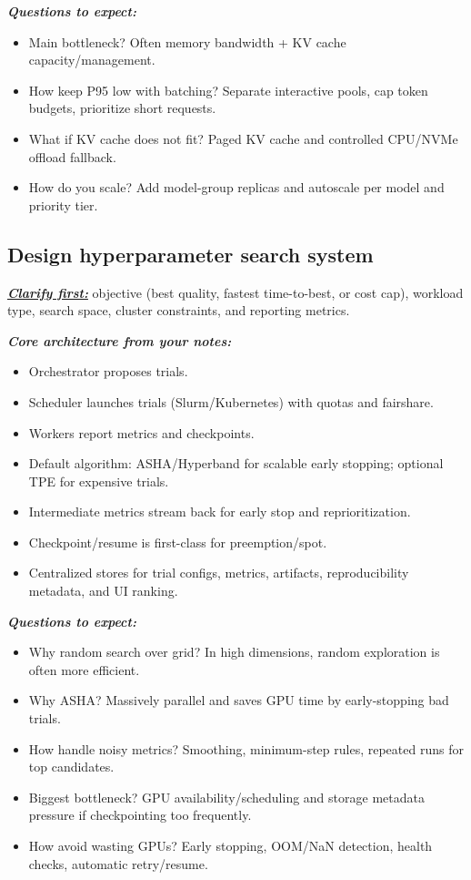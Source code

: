 \documentclass[12pt]{article}
\newcommand{\keysent}[1]{\textbf{\textit{\uline{#1}}}}
\let\origtextbf\textbf
\renewcommand{\textbf}[1]{\origtextbf{\textit{#1}}}
\begin{document}
\textbf{Questions to expect:}
\begin{itemize}
\item Main bottleneck? Often memory bandwidth + KV cache capacity/management.
\item How keep P95 low with batching? Separate interactive pools, cap token budgets, prioritize short requests.
\item What if KV cache does not fit? Paged KV cache and controlled CPU/NVMe offload fallback.
\item How do you scale? Add model-group replicas and autoscale per model and priority tier.
\end{itemize}

\subsection{Design hyperparameter search system}
\keysent{Clarify first:} objective (best quality, fastest time-to-best, or cost cap), workload type, search space, cluster constraints, and reporting metrics.

\textbf{Core architecture from your notes:}
\begin{itemize}
\item Orchestrator proposes trials.
\item Scheduler launches trials (Slurm/Kubernetes) with quotas and fairshare.
\item Workers report metrics and checkpoints.
\item Default algorithm: ASHA/Hyperband for scalable early stopping; optional TPE for expensive trials.
\item Intermediate metrics stream back for early stop and reprioritization.
\item Checkpoint/resume is first-class for preemption/spot.
\item Centralized stores for trial configs, metrics, artifacts, reproducibility metadata, and UI ranking.
\end{itemize}

\textbf{Questions to expect:}
\begin{itemize}
\item Why random search over grid? In high dimensions, random exploration is often more efficient.
\item Why ASHA? Massively parallel and saves GPU time by early-stopping bad trials.
\item How handle noisy metrics? Smoothing, minimum-step rules, repeated runs for top candidates.
\item Biggest bottleneck? GPU availability/scheduling and storage metadata pressure if checkpointing too frequently.
\item How avoid wasting GPUs? Early stopping, OOM/NaN detection, health checks, automatic retry/resume.
\end{itemize}
\end{document}

